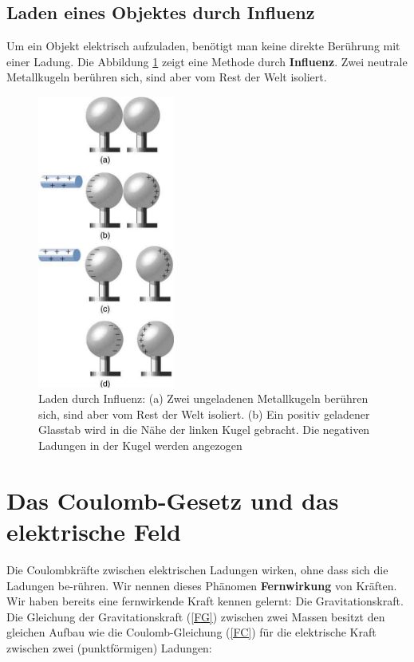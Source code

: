 \documentclass[11pt,twoside=false,open=any]{scrbook}
\begin{document}
\section{Laden eines Objektes durch Influenz} %
Um ein Objekt elektrisch aufzuladen, benötigt man keine direkte Berührung mit einer Ladung. Die Abbildung \ref{fig:influenz1} zeigt eine Methode durch \textbf{Influenz}. Zwei neutrale Metallkugeln berühren sich, sind aber vom Rest der Welt isoliert. 
\begin{figure}[h]
\centering
\includegraphics[width=4.5cm]{influenz1.jpg}
\caption{Laden durch Influenz: (a) Zwei ungeladenen Metallkugeln berühren sich, sind aber vom Rest der Welt isoliert. (b) Ein positiv geladener Glasstab wird in die Nähe der linken Kugel gebracht. Die negativen Ladungen in der Kugel werden angezogen} 
\label{fig:influenz1}
\end{figure}









\chapter{Das Coulomb-Gesetz und das elektrische Feld}
Die Coulombkräfte zwischen elektrischen Ladungen wirken, ohne dass sich die Ladungen be-rühren. Wir nennen dieses Phänomen \textbf{Fernwirkung} von Kräften. Wir haben bereits eine fernwirkende Kraft kennen gelernt: Die Gravitationskraft. Die Gleichung der Gravitationskraft (\ref{FG}) zwischen zwei Massen besitzt den gleichen Aufbau wie die Coulomb-Gleichung (\ref{FC}) für die elektrische Kraft zwischen zwei (punktförmigen) Ladungen:
\end{document}
